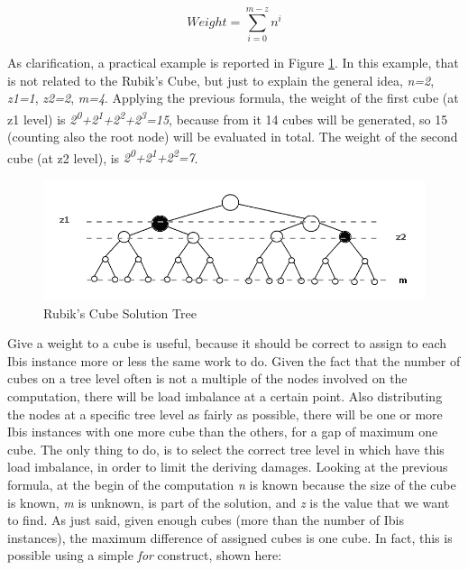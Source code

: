 \documentclass[a4paper]{article}
\begin{document}
\begin{equation} 
\label{eq:eqWe}
Weight = \sum_{i=0}^{m-z}{n^i}
\end{equation}
\FloatBarrier

As clarification, a practical example is reported in Figure \ref{fig:treeBin}. In this example, that is not related to the Rubik's Cube, but just to explain the general idea, \textit{n=2}, \textit{z1=1}, \textit{z2=2}, \textit{m=4}. Applying the previous formula, the weight of the first cube (at z1 level) is \textit{2\textsuperscript{0}+2\textsuperscript{1}+2\textsuperscript{2}+2\textsuperscript{3}=15}, because from it 14 cubes will be generated, so 15 (counting also the root node) will be evaluated in total. The weight of the second cube (at z2 level), is \textit{2\textsuperscript{0}+2\textsuperscript{1}+2\textsuperscript{2}=7}. 

\begin{figure}[ht]
  \centering
  \includegraphics[width=0.8\linewidth]{tree_bin}
  \caption{Rubik's Cube Solution Tree}
  \label{fig:treeBin}
\end{figure}
\FloatBarrier

Give a weight to a cube is useful, because it should be correct to assign to each Ibis instance more or less the same work to do. Given the fact that the number of cubes on a tree level often is not a multiple of the nodes involved on the computation, there will be load imbalance at a certain point. Also distributing the nodes at a specific tree level as fairly as possible, there will be one or more Ibis instances with one more cube than the others, for a gap of maximum one cube. The only thing to do, is to select the correct tree level in which have this load imbalance, in order to limit the deriving damages. Looking at the previous formula, at the begin of the computation \textit{n} is known because the size of the cube is known, \textit{m} is unknown, is part of the solution, and \textit{z} is the value that we want to find. As just said, given enough cubes (more than the number of Ibis instances), the maximum difference of assigned cubes is one cube. In fact, this is possible using a simple \textit{for} construct, shown here:
\end{document}
